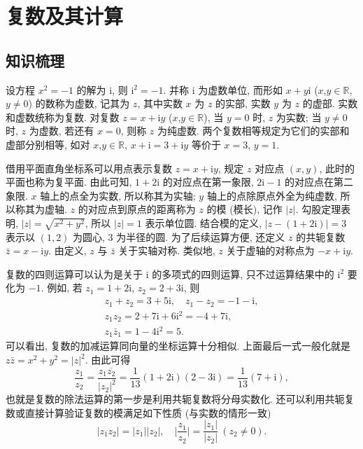 
\section{复数及其计算}

\subsection{知识梳理}
设方程 $x^2=-1$ 的解为 $\mathrm{i}$, 则 $\mathrm{i}^2=-1$. 
并称 $\mathrm{i}$ 为虚数单位, 而形如 $x+y\mathrm{i}$ 
($x$,$y\in\mathbb{R}$, $y\neq0$) 的数称为虚数, 记其为 $z$, 
其中实数 $x$ 为 $z$ 的实部, 实数 $y$ 为 $z$ 的虚部. 
实数和虚数统称为复数. 对复数 $z=x+\mathrm{i}y$ ($x$,$y\in\mathbb{R}$),
当 $y=0$ 时, $z$ 为实数; 当 $y\neq0$ 时, $z$ 为虚数, 
若还有 $x=0$, 则称 $z$ 为纯虚数. 两个复数相等规定为它们的实部和虚部分别相等, 如对 $x$,$y\in\mathbb{R}$, $x+\mathrm{i}= 3+\mathrm{i}y$ 等价于
$x=3$, $y=1$.

借用平面直角坐标系可以用点表示复数 $z=x+\mathrm{i}y$, 规定 $z$ 对应点 $(x,y)$, 此时的平面也称为复平面. 由此可知, $1+2\mathrm{i}$ 的对应点在第一象限, $2\mathrm{i}-1$ 的对应点在第二象限. $x$ 轴上的点全为实数, 所以称其为实轴; $y$ 轴上的点除原点外全为纯虚数, 所以称其为虚轴. $z$ 的对应点到原点的距离称为 $z$ 的模 (模长), 记作 $|z|$. 勾股定理表明, $|z|=\sqrt{x^2+y^2}$, 所以 $|z|=1$ 表示单位圆. 结合模的定义, $|z-(1+2\mathrm{i})|=3$ 表示以 $(1,2)$ 为圆心, $3$ 为半径的圆. 为了后续运算方便, 还定义 $z$ 的共轭复数 $\bar{z}= x-\mathrm{i}y$. 由定义, $z$ 与 $\bar{z}$ 关于实轴对称. 类似地, $z$ 关于虚轴的对称点为 $-x+\mathrm{i}y$.

复数的四则运算可以认为是关于 $\mathrm{i}$ 的多项式的四则运算, 
只不过运算结果中的 $\mathrm{i}^2$ 要化为 $-1$. 
例如, 若 $z_1=1+2\mathrm{i}$, $z_2=2+3\mathrm{i}$, 则
\begin{gather*}
    z_1+z_2= 3+5\mathrm{i},\quad z_1-z_2= -1-\mathrm{i},\\
    z_1z_2= 2+7\mathrm{i}+6\mathrm{i}^2= -4+7\mathrm{i},\\
    z_1\bar{z}_1= 1-4\mathrm{i}^2=5.
\end{gather*}
可以看出, 复数的加减运算同向量的坐标运算十分相似. 上面最后一式一般化就是 $z\bar{z}=x^2+y^2=|z|^2$. 由此可得
\[\frac{z_1}{z_2}= \frac{z_1\overline{z_2}}{|z_2|^2}
    = \frac{1}{13}(1+2\mathrm{i})(2-3\mathrm{i})
    = \frac1{13}(7+\mathrm{i}),\]
也就是复数的除法运算的第一步是利用共轭复数将分母实数化.
还可以利用共轭复数或直接计算验证复数的模满足如下性质 (与实数的情形一致)
\[|z_1z_2|=|z_1||z_2|,\quad
    \Big|\frac{z_1}{z_2}\Big|= \frac{|z_1|}{|z_2|}\ (z_2\neq0).\]

